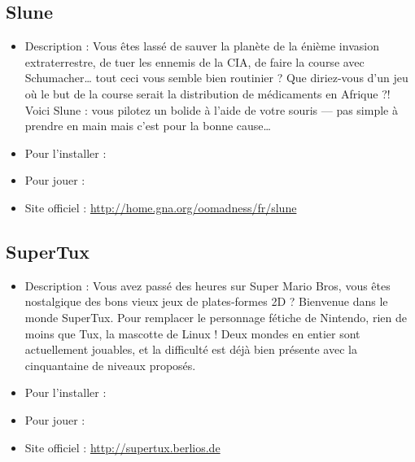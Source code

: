 \subsection{Slune}
\begin{itemize}
\begingroup
{}
\item Description : Vous êtes lassé de sauver la planète de la énième invasion extraterrestre, de tuer les ennemis de la CIA, de faire la course avec Schumacher\ldots{} tout ceci vous semble bien routinier ? Que diriez-vous d'un jeu où le but de la course serait la distribution de médicaments en Afrique ?! Voici Slune : vous pilotez un bolide à l'aide de votre souris --- pas simple à prendre en main mais c'est pour la bonne cause\ldots{}{\par}
\endgroup
\item Pour l'installer : 
\item Pour jouer : 
\item Site officiel : \url{http://home.gna.org/oomadness/fr/slune}{\par}
\end{itemize}
\subsection{SuperTux}
\begin{itemize}
\begingroup
{}
\item Description : Vous avez passé des heures sur Super Mario Bros, vous êtes nostalgique des bons vieux jeux de plates-formes 2D ? Bienvenue dans le monde SuperTux. Pour remplacer le personnage fétiche de Nintendo, rien de moins que Tux, la mascotte de Linux ! Deux mondes en entier sont actuellement jouables, et la difficulté est déjà bien présente avec la cinquantaine de niveaux proposés.{\par}
\item Pour l'installer : 
\item Pour jouer : 
\item Site officiel : \url{http://supertux.berlios.de}{\par}
\endgroup
\end{itemize}
